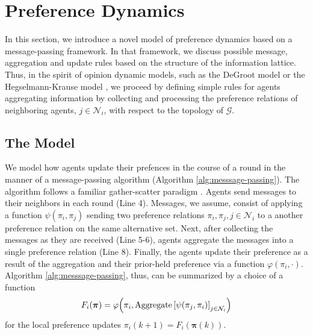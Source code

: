 \documentclass[conference]{ieeeconf}
\newcommand{\N}{\mathcal{N}}
\newcommand{\G}{\mathcal{G}}
\newcommand{\profile}{\boldsymbol{\pi}}
\DeclareMathOperator{\Aggregate}{Aggregate}
\begin{document}
\section{Preference Dynamics}
\label{sec:dynamics}

In this section, we introduce a novel model of preference dynamics based on a message-passing framework. In that framework, we discuss possible message, aggregation and update rules based on the structure of the information lattice. Thus, in the spirit of opinion dynamic models, such as the DeGroot model \cite{degroot1974} or the Hegselmann-Krause model \cite{hegselmann2002}, we proceed by defining simple rules for agents aggregating information by collecting and processing the preference relations of neighboring agents, $j \in \N_i$, with respect to the topology of $\G$.

\subsection{The Model}

We model how agents update their prefences in the course of a round in the manner of a message-passing algorithm (Algorithm \ref{alg:messsage-passing}). The algorithm follows a familiar gather-scatter paradigm \cite{dudzik}. Agents send messages to their neighbors in each round (Line 4). Messages, we assume, consist of applying a function $\psi(\pi_i,\pi_j)$ sending two preference relations $\pi_i, \pi_j, j \in \N_i$ to a another preference relation on the same alternative set.
Next, after collecting the messages as they are received (Line 5-6), agents aggregate the messages into a single preference relation (Line 8). Finally, the agents update their preference as a result of the aggregation and their prior-held preference via a function  $\varphi(\pi_i,\cdot)$. Algorithm \ref{alg:messsage-passing}, thus, can be summarized by a choice of a function
\begin{align}
    F_i(\profile) = \varphi\Bigl(\pi_i, \Aggregate{\left[ \psi(\pi_j, \pi_i)\right]_{j \in \N_i}} \Bigr) \label{eq:message-passing}
\end{align}
for the local preference updates $\pi_i(k+1) = F_i\left( \profile(k) \right)$.
\end{document}
